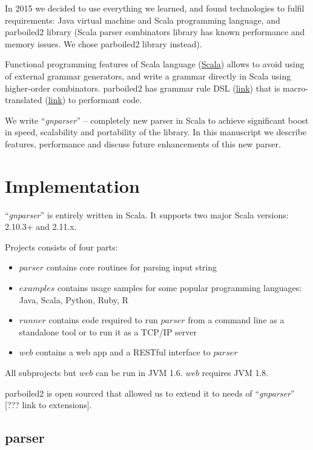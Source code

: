 \documentclass{bmcart}
\begin{document}
In 2015 we decided to use everything we learned, and found technologies to
fulfil requirements: Java virtual machine and Scala programming language, and
parboiled2 library (Scala parser combinators library has known performance and
memory issues. We chose parboiled2 library instead).

Functional programming features of Scala language (\href{http://infoscience.ep
fl.ch/record/52656/files/ScalaOverview.pdf}{Scala}) allows to avoid using of
external grammar generators, and write a grammar directly in Scala using
higher-order combinators. parboiled2  has grammar rule DSL
(\href{https://github.com/sirthias/parboiled2/#the-rule-dsl}{link}) that is
macro-translated (\href{http://dl.acm.org/citation.cfm?id=2489840}{link}) to
performant code.

We write ``\textit{gnparser}'' -- completely new parser in Scala to achieve
significant boost in speed, scalability and portability of the library. In
this manuscript we describe features, performance and discuss future
enhancements of this new parser.

\section*{Implementation}

``\textit{gnparser}'' is entirely written in Scala. It supports two major
Scala versions: 2.10.3+ and 2.11.x.

Projects consists of four parts:

\begin{itemize}
  \item $parser$ contains core routines for parsing input string
  \item $examples$ contains usage samples for some popular programming
  languages: Java, Scala, Python, Ruby, R
  \item $runner$ contains code required to run $parser$ from a command line
  as a standalone tool or to run it as a TCP/IP server
  \item $web$ contains a web app and a RESTful interface to $parser$
\end{itemize}

All subprojects but $web$ can be run in JVM 1.6. $web$ requires JVM 1.8.

parboiled2 is open sourced that allowed us to extend it to needs of
``\textit{gnparser}'' [??? link to extensions].

\subsection*{parser}
\end{document}
